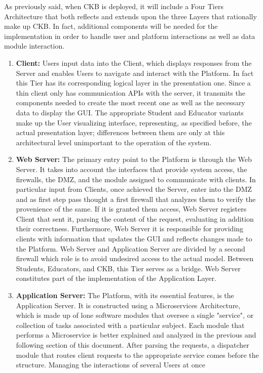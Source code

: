 As previously said, when CKB is deployed, it will include a Four Tiers Architecture that both reflects and extends upon the three Layers that rationally make up CKB.
In fact, additional components will be needed for the implementation in order to handle user and platform interactions as well as data module interaction.
\begin{enumerate}[label=$\bullet$]
    \item \textbf{Client:} Users input data into the Client, which displays responses from the Server and enables Users to navigate and interact with the Platform. In fact this Tier has its corresponding logical layer in the presentation one. 
    Since a thin client only has communication APIs with the server, it transmits the components needed to create the most recent one as well as the necessary data to display the GUI.
    The appropriate Student and Educator variants make up the User visualizing interface, representing, as specified before, the actual presentation layer; differences between them 
    are only at this architectural level unimportant to the operation of the system.
    \item \textbf{Web Server:} The primary entry point to the Platform is through the Web Server. It takes into account the interfaces that provide system access, the firewalls, the DMZ, and the module assigned to communicate with 
    clients. In particular input from Clients, once achieved the Server, enter into the DMZ and as first step pass thought a first firewall that analyzes them to verify the provenience of the same. If it is granted them access, Web Server registers Client that sent it, parsing the content of the request, evaluating in addition their correctness. 
    Furthermore, Web Server it is responsible for providing clients with information that updates the GUI and reflects changes made to the Platform. Web Server and Application Server are divided by a second firewall which role is to avoid undesired access to the actual model. Between Students, Educators, 
    and CKB, this Tier serves as a bridge. Web Server constitutes part of the implementation of the Application Layer.
    \item \textbf{Application Server:} The Platform, with its essential features, is the Application Server. It is constructed using a Microservices Architecture, which is made up of lone software modules that oversee a single 
    "service", or collection of tasks associated with a particular subject. Each module that performs a Microservice is better explained and analyzed in the previous and following section of this document. After parsing the requests, a dispatcher module that routes client requests to the appropriate service comes before the structure. Managing the interactions of several Users at once 

\end{enumerate}
